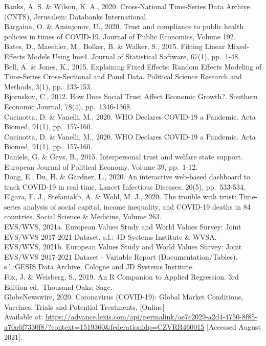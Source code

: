 \documentclass[
  11pt,
]{article}
\begin{document}
Banks, A. S. \& Wilson, K. A., 2020. Cross-National Time-Series Data Archive (CNTS), Jerusalem: Databanks International.\\
Bargaina, O. \& Aminjonov, U., 2020. Trust and compliance to public health policies in times of COVID-19. Journal of Public Economics, Volume 192.\\
Bates, D., Maechler, M., Bolker, B. \& Walker, S., 2015. Fitting Linear Mixed-Effects Models Using lme4. Journal of Statistical Software, 67(1), pp.~1-48.\\
Bell, A. \& Jones, K., 2015. Explaining Fixed Effects: Random Effects Modeling of Time-Series Cross-Sectional and Panel Data. Political Science Research and Methods, 3(1), pp.~133-153.\\
Bjornskov, C., 2012. How Does Social Trust Affect Economic Growth?. Southern Economic Journal, 78(4), pp.~1346-1368.\\
Cucinotta, D. \& Vanelli, M., 2020. WHO Declares COVID-19 a Pandemic. Acta Biomed, 91(1), pp.~157-160.\\
Cucinotta, D. \& Vanelli, M., 2020. WHO Declares COVID-19 a Pandemic. Acta Biomed, 91(1), pp.~157-160.\\
Daniele, G. \& Geys, B., 2015. Interpersonal trust and welfare state support. European Journal of Political Economy, Volume 39, pp.~1-12.\\
Dong, E., Du, H. \& Gardner, L., 2020. An interactive web-based dashboard to track COVID-19 in real time. Lancet Infectious Diseases, 20(5), pp.~533-534.\\
Elgara, F. J., Stefaniakb, A. \& Wohl, M. J., 2020. The trouble with trust: Time-series analysis of social capital, income inequality, and COVID-19 deaths in 84 countries. Social Science \& Medicine, Volume 263.\\
EVS/WVS, 2021a. European Values Study and World Values Survey: Joint EVS/WVS 2017-2021 Dataset, s.l.: JD Systems Institute \& WVSA.\\
EVS/WVS, 2021b. European Values Study and World Values Survey: Joint EVS/WVS 2017-2021 Dataset - Variable Report (Documentation/Tables). s.l.:GESIS Data Archive, Cologne and JD Systems Institute.\\
Fox, J. \& Weisberg, S., 2019. An R Companion to Applied Regression. 3rd Edition ed.~Thousand Oaks: Sage.\\
GlobeNewswire, 2020. Coronavirus (COVID-19): Global Market Conditions, Vaccines, Trials and Potential Treatments. {[}Online{]}\\
Available at: \url{https://advance.lexis.com/api/permalink/ae7c2029-a2d4-4750-8f85-a70a6f7330f8/?context=1519360\&federationidp=CZVRR460015} {[}Accessed August 2021{]}.\\
\end{document}
